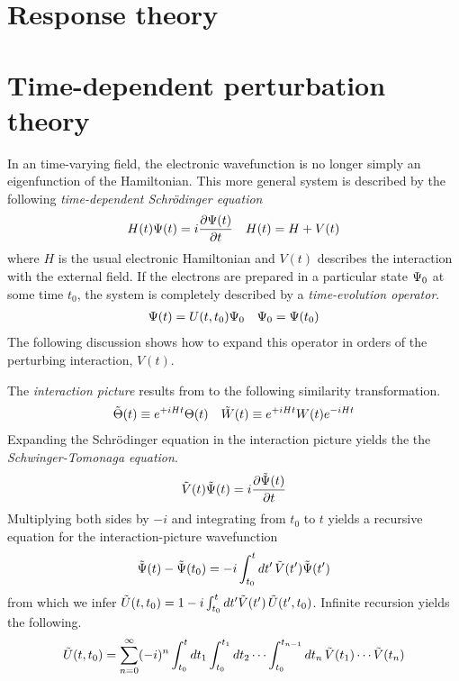 \documentclass[11pt]{article}
\numberwithin{equation}{section}
\begin{document}
\setlength{\abovedisplayskip}{5pt}
\setlength{\belowdisplayskip}{5pt}


\setcounter{section}{8}
\section{Response theory}


\newpage
\appendix

\section{Time-dependent perturbation theory}

\begin{rmk}
In an time-varying field, the electronic wavefunction is no longer simply an eigenfunction of the Hamiltonian.
This more general system is described by the following \textit{time-dependent Schr\"odinger equation}
\begin{align}
\label{eq:schrodinger-equation}
  H(t)
  \Psi (t)
=
  i
  \frac {\partial\Psi (t)}{\partial t}
&&
  H(t)
=
  H
+
  V(t)
\end{align}
where $H$ is the usual electronic Hamiltonian and $V(t)$ describes the interaction with the external field.
If the electrons are prepared in a particular state $\Psi _0$ at some time $t_0$, the system is completely described by a \textit{time-evolution operator}.
\begin{align}
  \Psi (t)=U(t,t_0)\Psi _0
&&
  \Psi _0
=
  \Psi (t_0)
\end{align}
The following discussion shows how to expand this operator in orders of the perturbing interaction, $V(t)$.
\end{rmk}

\begin{dfn}
The \textit{interaction picture} results from to the following similarity transformation.
\begin{align}
  \tilde{\Theta }(t)
\equiv
  e^{+iHt}
  \Theta (t)
&&
  \tilde{W}(t)
\equiv
  e^{+iHt}
  W(t)
  e^{-iHt}
\end{align}
Expanding the Schr\"odinger equation in the interaction picture yields the the \textit{Schwinger-Tomonaga equation}.
\begin{align}
\label{eq:schwinger-tomonaga}
  \tilde{V}(t)
  \tilde{\Psi }(t)
=
  i
  \frac {\partial\tilde{\Psi }(t)}{\partial t}
\end{align}
Multiplying both sides by $-i$ and integrating from $t_0$ to $t$ yields a recursive equation for the interaction-picture wavefunction
\begin{align}
\label{eq:integrated-schwinger-tomonaga-equation}
  \tilde{\Psi }(t)
-
  \tilde{\Psi }(t_0)
=
-
  i
  \int_{t_0}^t
  dt'\,
  \tilde{V}(t')
  \tilde{\Psi }(t')
\end{align}
from which we infer
$
  \tilde{U}(t,t_0)
=
  1
-
  i
  \int_{t_0}^t
  dt'
  \tilde{V}(t')\,
  \tilde{U}(t',t_0)
$.
Infinite recursion yields the following.
\begin{align}
\label{eq:time-evolution-infinite-recursion}
  \tilde{U}(t,t_0)
=
  \sum_{n=0}^\infty
  (-i)^n
  \int_{t_0}^t
  dt_1
  \int_{t_0}^{t_1}
  dt_2
  \cdots
  \int_{t_0}^{t_{n-1}}
  dt_n
  \,
  \tilde{V}(t_1)
  \cdots
  \tilde{V}(t_n)
\end{align}
\end{dfn}
\end{document}
